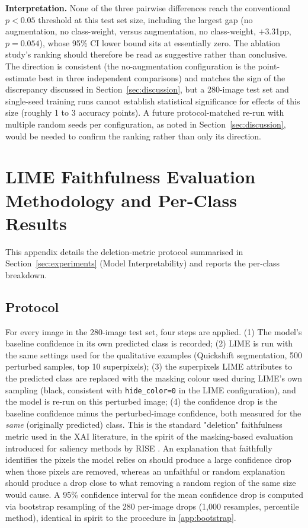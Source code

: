 \textbf{Interpretation.} None of the three pairwise differences reach the conventional $p < 0.05$ threshold at this test set size, including the largest gap (no augmentation, no class-weight, versus augmentation, no class-weight, $+$3.31pp, $p = 0.054$), whose 95\% CI lower bound sits at essentially zero. The ablation study's ranking should therefore be read as suggestive rather than conclusive. The direction is consistent (the no-augmentation configuration is the point-estimate best in three independent comparisons) and matches the sign of the discrepancy discussed in Section~\ref{sec:discussion}, but a 280-image test set and single-seed training runs cannot establish statistical significance for effects of this size (roughly 1 to 3 accuracy points). A future protocol-matched re-run with multiple random seeds per configuration, as noted in Section~\ref{sec:discussion}, would be needed to confirm the ranking rather than only its direction.

\section{LIME Faithfulness Evaluation Methodology and Per-Class Results}
\label{app:lime_faithfulness}

This appendix details the deletion-metric protocol summarised in Section~\ref{sec:experiments} (Model Interpretability) and reports the per-class breakdown.

\subsection{Protocol}

For every image in the 280-image test set, four steps are applied. (1) The model's baseline confidence in its own predicted class is recorded; (2) LIME is run with the same settings used for the qualitative examples (Quickshift segmentation, 500 perturbed samples, top 10 superpixels); (3) the superpixels LIME attributes to the predicted class are replaced with the masking colour used during LIME's own sampling (black, consistent with \texttt{hide\_color=0} in the LIME configuration), and the model is re-run on this perturbed image; (4) the confidence drop is the baseline confidence minus the perturbed-image confidence, both measured for the \emph{same} (originally predicted) class. This is the standard "deletion" faithfulness metric used in the XAI literature, in the spirit of the masking-based evaluation introduced for saliency methods by RISE \citep{petsiuk2018rise}. An explanation that faithfully identifies the pixels the model relies on should produce a large confidence drop when those pixels are removed, whereas an unfaithful or random explanation should produce a drop close to what removing a random region of the same size would cause. A 95\% confidence interval for the mean confidence drop is computed via bootstrap resampling of the 280 per-image drops (1,000 resamples, percentile method), identical in spirit to the procedure in \ref{app:bootstrap}.

